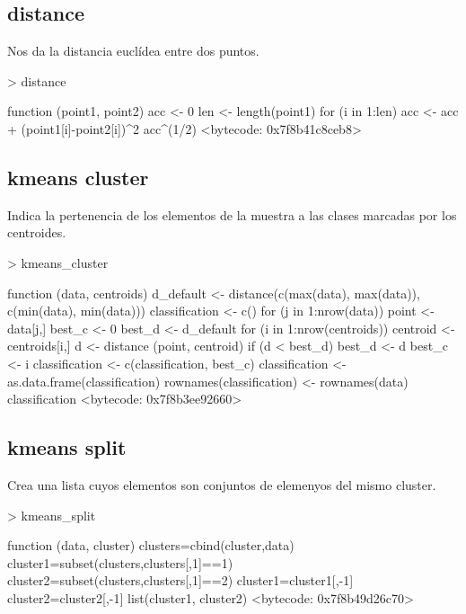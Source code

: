 \documentclass [a4paper] {article}
\begin{document}
\subsection{distance}
Nos da la distancia euclídea entre dos puntos.
\begin{Schunk}
\begin{Sinput}
> distance
\end{Sinput}
\begin{Soutput}
function (point1, point2) {
  acc <- 0
  len <- length(point1)
  for (i in 1:len){
    acc <- acc + (point1[i]-point2[i])^2
  }
  acc^(1/2)
}
<bytecode: 0x7f8b41c8ceb8>
\end{Soutput}
\end{Schunk}
\subsection{kmeans cluster}
Indica la pertenencia de los elementos de la muestra a las clases marcadas por los centroides.
\begin{Schunk}
\begin{Sinput}
> kmeans_cluster
\end{Sinput}
\begin{Soutput}
function (data, centroids) {
  d_default <- distance(c(max(data), max(data)), c(min(data), min(data)))
  classification <- c()
  for (j in 1:nrow(data)){
      point <- data[j,]
      best_c <- 0
      best_d <- d_default
      for (i in 1:nrow(centroids)){
        centroid <- centroids[i,]
        d <- distance (point, centroid)
        if (d < best_d){
          best_d <- d
          best_c <- i
        }
    }
    classification <- c(classification, best_c)
  }
  classification <- as.data.frame(classification)
  rownames(classification) <- rownames(data)
  classification
}
<bytecode: 0x7f8b3ee92660>
\end{Soutput}
\end{Schunk}
\subsection{kmeans split}
Crea una lista cuyos elementos son conjuntos de elemenyos del mismo cluster.
\begin{Schunk}
\begin{Sinput}
> kmeans_split
\end{Sinput}
\begin{Soutput}
function (data, cluster) {
  clusters=cbind(cluster,data)
  cluster1=subset(clusters,clusters[,1]==1)
  cluster2=subset(clusters,clusters[,1]==2)
  cluster1=cluster1[,-1]
  cluster2=cluster2[,-1]
  list(cluster1, cluster2)
}
<bytecode: 0x7f8b49d26c70>
\end{Soutput}
\end{Schunk}
\end{document}
